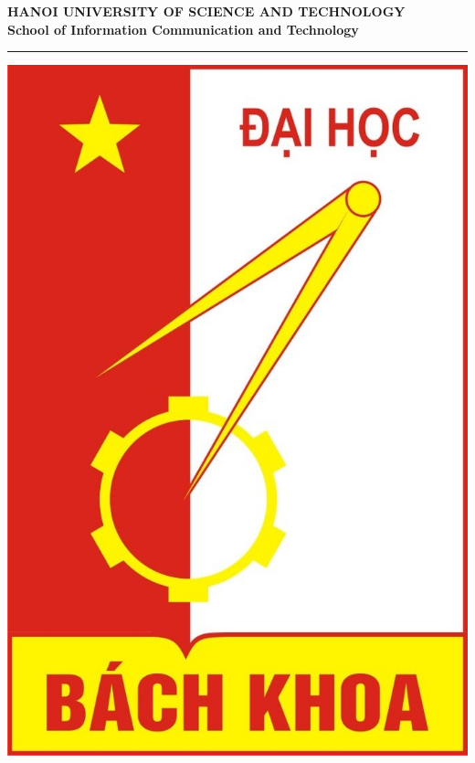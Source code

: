 \documentclass[12pt, sort&compress]{report}
\begin{document}
\captionsenglish
\dateUSenglish
\begin{center}
	{\fontsize{16}{\baselineskip}\selectfont\sf\bfseries HANOI UNIVERSITY OF SCIENCE AND TECHNOLOGY}\\[15pt]	
	{\fontsize{17}{\baselineskip}\selectfont\sf\bfseries School of Information Communication and Technology}
	\begin{minipage}{0.6\linewidth}
		\rule{\linewidth}{1pt}
	\end{minipage}
	\vspace*{.5cm}
	\begin{center} 
		{\includegraphics[scale=0.15]{images/HUSTlogo.jpg}}
	\end{center}
	\vspace*{.3cm}
	

\end{center}
\end{document}
